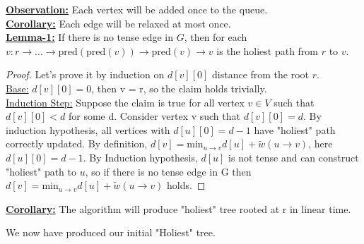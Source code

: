 \documentclass{article}
\begin{document}
\textbf{\underline{Observation:}} Each vertex will be added once to the queue. \\

\textbf{\underline{Corollary:}} Each edge will be relaxed at most once. \\

\textbf{\underline{Lemma-1:}} If there is no tense edge in $G$, then for each 
$v: r \rightarrow \ldots \rightarrow \text{pred}(\text{pred}(v)) \rightarrow 
\text{pred}(v) \rightarrow v$ is the holiest path from $r$ to $v$.

\begin{proof} Let's prove it by induction on $d[v][0]$ distance from the root $r$. \\
\underline{Base:} $d[v][0] = 0$, then v = r, so the claim holds trivially. \\
\underline{Induction Step:} Suppose the claim is true for all vertex $v \in V$ 
such that $d[v][0] < d$ for some d. Consider vertex v such that $d[v][0] = d$. 
By induction hypothesis, all vertices with $d[u][0] = d-1$ have "holiest" path 
correctly updated. By definition, $d[v] = \text{min}_{u \rightarrow v}{d[u] + 
\tilde w(u \rightarrow v)}$, here $d[u][0] = d-1$. By Induction hypothesis, $d[u]$ 
is not tense and can construct "holiest" path to $u$, so if there is no tense
edge in G then $d[v] = \text{min}_{u \rightarrow v}{d[u] + \tilde w(u \rightarrow v)}$ 
holds.
\end{proof}

\textbf{\underline{Corollary:}} The algorithm will produce "holiest" tree rooted at r in linear time.

We now have produced our initial "Holiest" tree.

\newpage
\end{document}
